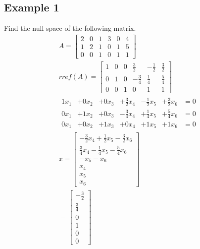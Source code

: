 \documentclass{article}
\theoremstyle{mytheoremstyle}
\theoremstyle{mytheoremstyle}
\theoremstyle{myproblemstyle}
\begin{document}
    \subsection*{Example 1}
    Find the null space of the following matrix.
    \begin{align*}
        A = \begin{bmatrix}
            2 & 0 & 1 & 3 & 0 & 4 \\
            1 & 2 & 1 & 0 & 1 & 5 \\
            0 & 0 & 1 & 0 & 1 & 1
        \end{bmatrix} \\
        rref(A) = \begin{bmatrix}
            1 & 0 & 0 & \frac{3}{2} & -\frac{1}{2} & \frac{3}{2} \\
            0 & 1 & 0 & -\frac{3}{4} & \frac{1}{4} & \frac{5}{4} \\
            0 & 0 & 1 & 0 & 1 & 1
        \end{bmatrix} \\
        \begin{matrix}
            1 x_1 &+ 0 x_2 &+ 0 x_3 &+ \frac{3}{2}  x_4 &- \frac{1}{2}  x_5 &+ \frac{3}{2} x_6 & =0 \\
            0 x_1 &+ 1 x_2 &+ 0 x_3 &- \frac{3}{4}  x_4 &+ \frac{1}{4}  x_5 &+ \frac{5}{4} x_6 & =0 \\
            0 x_1 &+ 0 x_2 &+ 1 x_3 &+ 0            x_4 &+ 1            x_5 &+ 1           x_6 & =0
        \end{matrix} \\
        x = \begin{bmatrix}
            -\frac{3}{2} x_4 + \frac{1}{2} x_5 - \frac{3}{2} x_6 \\
            \frac{3}{4} x_4 -\frac{1}{4} x_5 - \frac{5}{4} x_6 \\
            -x_5 -x_6 \\
            x_4 \\
            x_5 \\
            x_6
        \end{bmatrix} \\
        = \begin{bmatrix}
            -\frac{3}{2} \\
            \frac{3}{4} \\
            0 \\
            1 \\
            0 \\
            0

\end{bmatrix}
\end{align*}
\end{document}
